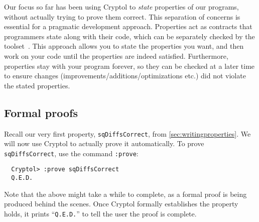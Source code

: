 
Our focus so far has been using Cryptol to \emph{state} properties of
our programs, without actually trying to prove them correct. This
separation of concerns is essential for a pragmatic development
approach.  Properties act as contracts that programmers state along
with their code, which can be separately checked by the
toolset~\cite{erkok-matthews-cryptolEqChecking-09}.  This approach
allows you to state the properties you want, and then work on your
code until the properties are indeed satisfied. Furthermore,
properties stay with your program forever, so they can be checked at a
later time to ensure changes (improvements/additions/optimizations
etc.) did not violate the stated properties.

\subsection{Formal proofs}
\label{sec:formal-proofs}

Recall our very first property, {\tt sqDiffsCorrect}, from
\autoref{sec:writingproperties}. We will now use Cryptol to
actually prove it automatically.  To prove {\tt sqDiffsCorrect}, use
the command {\tt :prove}:\indCmdProve
\begin{Verbatim}
  Cryptol> :prove sqDiffsCorrect
  Q.E.D.
\end{Verbatim}
Note that the above might take a while to complete, as a formal proof
is being produced behind the scenes.  Once Cryptol formally
establishes the property holds, it prints ``{\tt Q.E.D.}'' to tell the
user the proof is complete.\indQED\indProve


